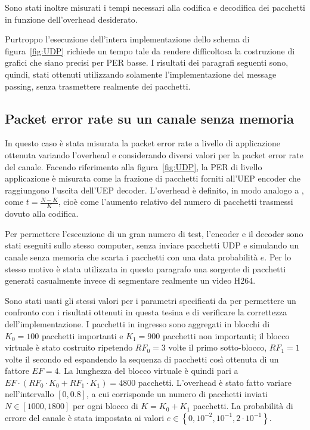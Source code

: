 \documentclass[italian, a4paper, 12pt]{article}
\begin{document}
Sono stati inoltre misurati i tempi necessari alla codifica e
decodifica dei pacchetti in funzione dell'overhead desiderato.

Purtroppo l'esecuzione dell'intera implementazione dello schema di
figura~\ref{fig:UDP} richiede un tempo tale da rendere difficoltosa la
costruzione di grafici che siano precisi per PER basse.
%
I risultati dei paragrafi seguenti sono, quindi, stati ottenuti
utilizzando solamente l'implementazione del message passing, senza
trasmettere realmente dei pacchetti.

\subsection{Packet error rate su un canale senza memoria}
In questo caso è stata misurata la packet error rate a livello di
applicazione ottenuta variando l'overhead e considerando diversi
valori per la packet error rate del canale.
%
Facendo riferimento alla figura~\ref{fig:UDP}, la PER di livello
applicazione è misurata come la frazione di pacchetti forniti all'UEP
encoder che raggiungono l'uscita dell'UEP decoder.
%
L'overhead è definito, in modo analogo a \cite{uep}, come $t =
\frac{N-K}{K}$, cioè come l'aumento relativo del numero di pacchetti
trasmessi dovuto alla codifica.

Per permettere l'esecuzione di un gran numero di test, l'encoder e il
decoder sono stati eseguiti sullo stesso computer, senza inviare
pacchetti UDP e simulando un canale senza memoria che scarta i
pacchetti con una data probabilità $e$.
%
Per lo stesso motivo è stata utilizzata in questo paragrafo una
sorgente di pacchetti generati casualmente invece di segmentare
realmente un video H264.

Sono stati usati gli stessi valori per i parametri specificati da
\cite{uep} per permettere un confronto con i risultati ottenuti in
questa tesina e di verificare la correttezza dell'implementazione.
%
I pacchetti in ingresso sono aggregati in blocchi di $K_0 = 100$
pacchetti importanti e $K_1 = 900$ pacchetti non importanti; il blocco
virtuale è stato costruito ripetendo $RF_0 = 3$ volte il primo
sotto-blocco, $RF_1 = 1$ volte il secondo ed espandendo la sequenza di
pacchetti così ottenuta di un fattore $EF = 4$. La lunghezza del
blocco virtuale è quindi pari a $EF \cdot \left( RF_0 \cdot K_0 + RF_1
\cdot K_1 \right) = 4800$ pacchetti.
%
L'overhead è stato fatto variare nell'intervallo $[0, 0.8]$, a cui
corrisponde un numero di pacchetti inviati $N \in [1000, 1800]$ per
ogni blocco di $K=K_0+K_1$ pacchetti.
%
La probabilità di errore del canale è stata impostata ai valori
$e \in \left\{ 0, 10^{-2}, 10^{-1}, 2 \cdot 10^{-1} \right\}$.
\end{document}
